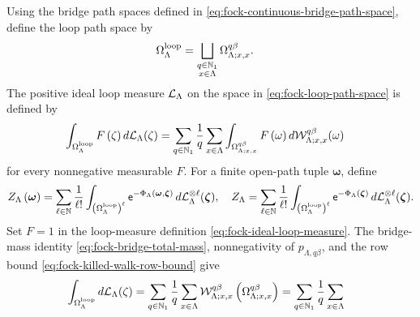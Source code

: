 \documentclass[11pt,a4paper]{article}
\theoremstyle{plain}
\theoremstyle{definition}
\theoremstyle{remark}
\begin{document}
Using the bridge path spaces defined in \eqref{eq:fock-continuous-bridge-path-space}, define the loop path space by \begin{equation}
\begin{aligned}
\Omega_{\Lambda}^{\mathrm{loop}}
& =
\bigsqcup_{\substack{q \in \mathbb{N}_1 \\ x \in \Lambda}}
\Omega_{\Lambda;x,x}^{q\beta}.
\end{aligned}
\label{eq:fock-loop-path-space}
\end{equation} The positive ideal loop measure \(\mathcal{L}_{\Lambda}\) on the space in \eqref{eq:fock-loop-path-space} is defined by \begin{equation}
\begin{aligned}
\int_{\Omega_{\Lambda}^{\mathrm{loop}}}
F \left( \zeta \right)\mathop{d \mathcal{L}_{\Lambda}}(\zeta)
& =
\sum_{q \in \mathbb{N}_1}\frac{1}{q}
\sum_{x \in \Lambda}
\int_{\Omega_{\Lambda;x,x}^{q\beta}}
F \left( \omega \right)\mathop{d \mathcal{W}_{\Lambda;x,x}^{q\beta}}(\omega)
\end{aligned}
\label{eq:fock-ideal-loop-measure}
\end{equation} for every nonnegative measurable \(F\). For a finite open-path tuple \(\boldsymbol{\omega}\), define \begin{equation}
\begin{aligned}
Z_{\Lambda} \left( \boldsymbol{\omega} \right)
=
\sum_{\ell \in \mathbb{N}}\frac{1}{\ell!}
\int_{\left( \Omega_{\Lambda}^{\mathrm{loop}} \right)^{\ell}}
\mathsf{e}^{-\Phi_{\Lambda} \left( \boldsymbol{\omega},\boldsymbol{\zeta} \right)}
\mathop{d \mathcal{L}_{\Lambda}^{\otimes\ell}}(\boldsymbol{\zeta}),
\quad
Z_{\Lambda}
=
\sum_{\ell \in \mathbb{N}}\frac{1}{\ell!}
\int_{\left( \Omega_{\Lambda}^{\mathrm{loop}} \right)^{\ell}}
\mathsf{e}^{-\Phi_{\Lambda} \left( \boldsymbol{\zeta} \right)}
\mathop{d \mathcal{L}_{\Lambda}^{\otimes\ell}}(\boldsymbol{\zeta}).
\end{aligned}
\label{eq:fock-open-path-loop-partition-functions}
\end{equation} Set \(F=1\) in the loop-measure definition \eqref{eq:fock-ideal-loop-measure}. The bridge-mass identity \eqref{eq:fock-bridge-total-mass}, nonnegativity of \(p_{\Lambda,q\beta}\), and the row bound \eqref{eq:fock-killed-walk-row-bound} give \[\begin{aligned}
& \int_{\Omega_{\Lambda}^{\mathrm{loop}}}\opdmsr{\msrcal{L}_{\Lambda}}(\zeta)
=
\sum_{q \in \semigrposint}\frac{1}{q}
\sum_{x \in \Lambda}
\fun{\msrcal{W}_{\Lambda;x,x}^{q\beta}}{\Omega_{\Lambda;x,x}^{q\beta}}
=
\sum_{q \in \semigrposint}\frac{1}{q}
\sum_{x \in \Lambda}

\end{aligned}\]
\end{document}
